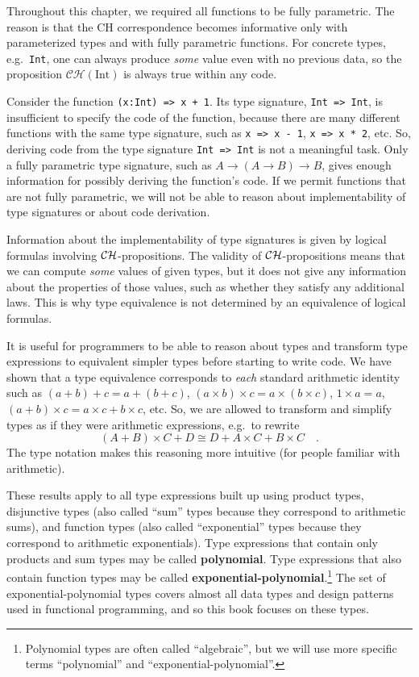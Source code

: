 Throughout this chapter, we required all functions to be fully parametric.
The reason is that the CH correspondence becomes informative only
with parameterized types and with fully parametric functions. For
concrete types, e.g.\ \lstinline!Int!, one can always produce \emph{some}
value even with no previous data, so the proposition $\mathcal{CH}(\text{Int})$
is always true within any code.

Consider the function \lstinline!(x:Int) => x + 1!. Its type signature,
\lstinline!Int => Int!, is insufficient to specify the code of the
function, because there are many different functions with the same
type signature, such as \lstinline!x => x - 1!, \lstinline!x => x * 2!,
etc. So, deriving code from the type signature \lstinline!Int => Int!
is not a meaningful task. Only a fully parametric type signature,
such as $A\rightarrow\left(A\rightarrow B\right)\rightarrow B$, gives
enough information for possibly deriving the function's code. If we
permit functions that are not fully parametric, we will not be able
to reason about implementability of type signatures or about code
derivation.

Information about the implementability of type signatures is given
by logical formulas involving ${\cal CH}$-propositions. The validity
of ${\cal CH}$-propositions means that we can compute \emph{some}
values of given types, but it does not give any information about
the properties of those values, such as whether they satisfy any additional
laws. This is why type equivalence is not determined by an equivalence
of logical formulas.

It is useful for programmers to be able to reason about types and
transform type expressions to equivalent simpler types before starting
to write code. We have shown that a type equivalence corresponds to
\emph{each} standard arithmetic identity such as $\left(a+b\right)+c=a+\left(b+c\right)$,
$\left(a\times b\right)\times c=a\times(b\times c)$, $1\times a=a$,
$\left(a+b\right)\times c=a\times c+b\times c$, etc. So, we are allowed
to transform and simplify types as if they were arithmetic expressions,
e.g.~to rewrite
\[
\left(A+B\right)\times C+D\cong D+A\times C+B\times C\quad.
\]
The type notation makes this reasoning more intuitive (for people
familiar with arithmetic). 

These results apply to all type expressions built up using product
types, disjunctive types (also called ``sum'' types because they
correspond to arithmetic sums), and function types (also called ``exponential''
types because they correspond to arithmetic exponentials). Type expressions
that contain only products and sum types may be called \textbf{polynomial}.
Type expressions that also contain function types may be called \textbf{exponential-polynomial}.\footnote{Polynomial types are often called ``algebraic'', but we will use
more specific terms ``polynomial'' and ``exponential-polynomial''.} The set of exponential-polynomial types covers almost all data types
and design patterns used in functional programming, and so this book
focuses on these types.

